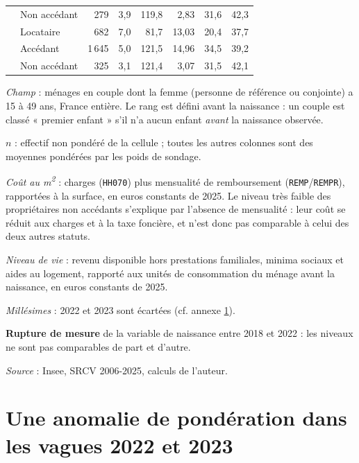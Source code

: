 \documentclass[12pt,a4paper]{article}
\begin{document}
\begin{table}[htbp]
\begin{threeparttable}
\begin{tabular}{llrrrrrr}
				 & Non accédant       & 279  & 3,9  & 119,8 & 2,83  & 31,6 & 42,3 \\
				\addlinespace
				\multirow{3}{*}{2025} & Locataire      & 682  & 7,0  & 81,7  & 13,03 & 20,4 & 37,7 \\
				 & Accédant           & 1\,645 & 5,0  & 121,5 & 14,96 & 34,5 & 39,2 \\
				 & Non accédant       & 325  & 3,1  & 121,4 & 3,07  & 31,5 & 42,1 \\
				\bottomrule
			\end{tabular}
			\begin{tablenotes}[flushleft]\scriptsize
				\item \textit{Champ} : ménages en couple dont la femme (personne de référence ou
				conjointe) a 15 à 49 ans, France entière. Le rang est défini avant la naissance :
				un couple est classé « premier enfant » s'il n'a aucun enfant \textit{avant} la
				naissance observée.
				\item $n$ : effectif non pondéré de la cellule ; toutes les autres colonnes sont
				des moyennes pondérées par les poids de sondage.
				\item \textit{Coût au m\textsuperscript{2}} : charges (\texttt{HH070}) plus mensualité
				de remboursement (\texttt{REMP}/\texttt{REMPR}), rapportées à la surface, en euros
				constants de 2025. Le niveau très faible des propriétaires non accédants s'explique
				par l'absence de mensualité : leur coût se réduit aux charges et à la taxe foncière,
				et n'est donc pas comparable à celui des deux autres statuts.
				\item \textit{Niveau de vie} : revenu disponible hors prestations familiales, minima
				sociaux et aides au logement, rapporté aux unités de consommation du ménage avant la
				naissance, en euros constants de 2025.
				\item \textit{Millésimes} : 2022 et 2023 sont écartées (cf. annexe \ref{annexe3}).
				\item \textbf{Rupture de mesure} de la variable de naissance entre 2018 et 2022 :
				les niveaux ne sont pas comparables de part et d'autre.
				\item \textit{Source} : Insee, SRCV 2006-2025, calculs de l'auteur.
			\end{tablenotes}
		\end{threeparttable}
	\end{table}

	\newpage

	\section{Une anomalie de pondération dans les vagues 2022 et 2023}\label{annexe3}
\end{document}
